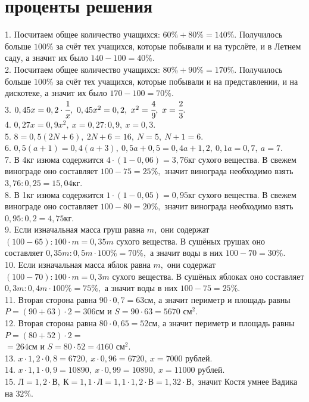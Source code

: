 \documentclass[12pt]{article}
\begin{document}
\section{проценты решения}
1. Посчитаем общее количество учащихся: $60\%+80\%=140\%.$ Получилось больше $100\%$ за счёт тех учащихся, которые побывали и на турслёте, и в Летнем саду, а значит их было $140-100=40\%.$\\
2. Посчитаем общее количество учащихся: $80\%+90\%=170\%.$ Получилось больше $100\%$ за счёт тех учащихся, которые побывали и на представлении, и на дискотеке, а значит их было $170-100=70\%.$\\
3. $0,45x=0,2\cdot\cfrac{1}{x},\ 0,45x^2=0,2,\ x^2=\cfrac{4}{9},\ x=\cfrac{2}{3}.$\\
4. $0,27x=0,9x^2,\ x=0,27:0,9,\ x=0,3.$\\
5. $8=0,5(2N+6),\ 2N+6=16,\ N=5,\ N+1=6.$\\
6. $0,5(a+1)=0,4(a+3),\ 0,5a+0,5=0,4a+1,2,\ 0,1a=0,7,\ a=7.$\\
7. В 4кг изюма содержится $4\cdot(1-0,06)=3,76$кг сухого вещества. В свежем винограде оно составляет $100-75=25\%,$ значит винограда необходимо взять $3,76:0,25=15,04$кг.\\
8. В 1кг изюма содержится $1\cdot(1-0,05)=0,95$кг сухого вещества. В свежем винограде оно составляет $100-80=20\%,$ значит винограда необходимо взять $0,95:0,2=4,75$кг.\\
9. Если изначальная масса груш равна $m,$ они содержат $(100-65):100\cdot m=0,35m$ сухого вещества. В сушёных грушах оно составляет $0,35m:0,5m\cdot100\%=70\%,$ а значит воды в них $100-70=30\%.$\\
10. Если изначальная масса яблок равна $m,$ они содержат $(100-70):100\cdot m=0,3m$ сухого вещества. В сушёных яблоках оно составляет $0,3m:0,4m\cdot100\%=75\%,$ а значит воды в них $100-75=25\%.$\\
11. Вторая сторона равна $90\cdot0,7=63$см, а значит периметр и площадь равны $P=(90+63)\cdot2=306$см и $S=90\cdot63=5670\text{ см}^2.$\\
12. Вторая сторона равна $80\cdot0,65=52$см, а значит периметр и площадь равны $P=(80+52)\cdot2=$\\$=264$см и $S=80\cdot52=4160\text{ см}^2.$\\
13. $x\cdot1,2\cdot0,8=6720,\ x\cdot0,96=6720,\ x=7000$ рублей.\\
14. $x\cdot1,1\cdot0,9=10890,\ x\cdot0,99=10890,\ x=11000$ рублей.\\
15. $\text{Л}=1,2\cdot\text{В},\ \text{К}=1,1\cdot\text{Л}=1,1\cdot1,2\cdot\text{В}=1,32\cdot\text{В},$ значит Костя умнее Вадика на $32\%.$\\
\end{document}
